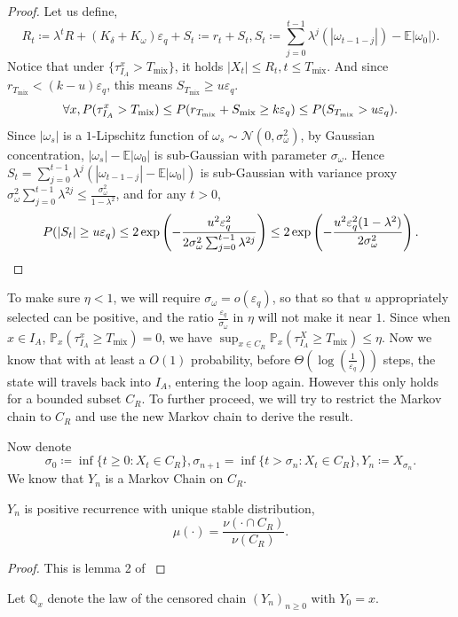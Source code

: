 \documentclass{article}
\begin{document}
\begin{proof}
Let us define,
\begin{equation*}
    R_t \coloneqq  \lambda^t R+(K_\delta+K_\omega)\varepsilon_q+S_t\coloneqq r_t+S_t, S_t\coloneqq \sum_{j=0}^{t-1}\lambda^j(|\omega_{t-1-j}|)-\mathbb E|\omega_0|).
\end{equation*}
Notice that under $\{\tau^x_{I_A}>T_{\text{mix}}\}$, it holds $|X_t|\leq R_t, t\leq T_{\text{mix}}$. And since $r_{T_{\text{mix}}}<(k-u)\varepsilon_q$, this means $S_{T_{\text{mix}}}\geq u\varepsilon_q$. 
\begin{equation*}
 \forall x, P(\tau^x_{I_A}>T_{\text{mix}})\leq P(r_{T_{\textnormal{mix}}}+S_{\text{mix}}\geq k\varepsilon_q)\leq P(S_{T_{\text{mix}}}>u\varepsilon_q).
 \end{equation*}
 Since $|\omega_s|$ is a $1$-Lipschitz function of $\omega_s\sim\mathcal N(0,\sigma_\omega^2)$,
by Gaussian concentration, $|\omega_s|-\mathbb E|\omega_0|$ is sub-Gaussian with parameter $\sigma_\omega$.
Hence $S_t=\sum_{j=0}^{t-1}\lambda^j(|\omega_{t-1-j}|-\mathbb E|\omega_0|)$
is sub-Gaussian with variance proxy
$\sigma_\omega^2\sum_{j=0}^{t-1}\lambda^{2j}\leq \frac{\sigma_\omega^2}{1-\lambda^2}$,
and for any $t>0$,
\begin{equation*}
    P(|S_t|\geq u\varepsilon_q)
    \leq 2\exp\left(-\frac{u^2\varepsilon_q^2}{2\sigma_\omega^2\sum_{j=0}^{t-1}\lambda^{2j}}\right)
    \leq 2\exp\left(-\frac{u^2\varepsilon_q^2(1-\lambda^2)}{2\sigma_\omega^2}\right).\qedhere
\end{equation*}
\end{proof}
To make sure $\eta<1$, we will require $\sigma_\omega=o(\varepsilon_q)$, so that  so that $u$ appropriately selected can be positive, and the ratio $\frac{\varepsilon_q}{\sigma_\omega}$ in $\eta$ will not make it near $1$.
Since when $x\in I_A$, $\mathbb P_x(\tau_{I_A}^x\geq T_{\text{mix}})=0$, we have $\sup_{x\in C_R}\mathbb P_x(\tau_{I_A}^X\geq T_{\text{mix}})\leq \eta$. 
Now we know that with at least a $O(1)$ probability, before $\Theta\left(\log(\frac{1}{\varepsilon_q})\right)$ steps, the state will travels back into $I_A$, entering the loop again. However this only holds for a bounded subset $C_R$. To further proceed, we will try to restrict the Markov chain to $C_R$ and use the new Markov chain to derive the result. 

Now denote 
\begin{equation*}
    \sigma_0\coloneqq \inf\{t\geq 0: X_t\in C_R\}, \sigma_{n+1}=\inf\{t>\sigma_n: X_t\in C_R\}, Y_n\coloneqq  X_{\sigma_n}.
\end{equation*}
We know that $Y_n$ is a Markov Chain on $C_R$. 
\begin{claim}
    $Y_n$ is positive recurrence with unique stable distribution,
    \begin{equation*}
        \mu(\cdot)=\frac{\nu(\cdot\cap C_R)}{\nu(C_R)}.
    \end{equation*}
\end{claim}
\begin{proof}
    This is lemma 2 of \citet{DBLP:journals/corr/abs-2012-07152}
\end{proof}
Let $\mathbb Q_x$ denote the law of the censored chain
$(Y_n)_{n\ge0}$ with $Y_0=x$.
\end{document}
